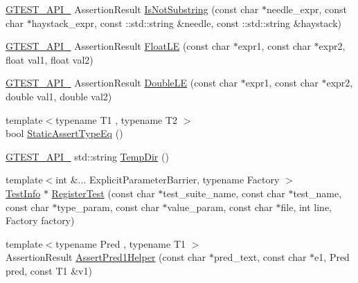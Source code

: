 \begin{DoxyCompactItemize}
\item 
\mbox{\hyperlink{_obj__test_2lib_2googletest-release-1_88_81_2googletest_2include_2gtest_2internal_2gtest-port_8h_aa73be6f0ba4a7456180a94904ce17790}{G\+T\+E\+S\+T\+\_\+\+A\+P\+I\+\_\+}} Assertion\+Result \mbox{\hyperlink{namespacetesting_abe7b3fa1c9528745f934d4a14155ea87}{Is\+Not\+Substring}} (const char $\ast$needle\+\_\+expr, const char $\ast$haystack\+\_\+expr, const \+::std\+::string \&needle, const \+::std\+::string \&haystack)
\item 
\mbox{\hyperlink{_obj__test_2lib_2googletest-release-1_88_81_2googletest_2include_2gtest_2internal_2gtest-port_8h_aa73be6f0ba4a7456180a94904ce17790}{G\+T\+E\+S\+T\+\_\+\+A\+P\+I\+\_\+}} Assertion\+Result \mbox{\hyperlink{namespacetesting_a2c9a2a391c72a7b02ea3024586e33af0}{Float\+LE}} (const char $\ast$expr1, const char $\ast$expr2, float val1, float val2)
\item 
\mbox{\hyperlink{_obj__test_2lib_2googletest-release-1_88_81_2googletest_2include_2gtest_2internal_2gtest-port_8h_aa73be6f0ba4a7456180a94904ce17790}{G\+T\+E\+S\+T\+\_\+\+A\+P\+I\+\_\+}} Assertion\+Result \mbox{\hyperlink{namespacetesting_ae10e2bb304b74abd1b06a2d912a8b43b}{Double\+LE}} (const char $\ast$expr1, const char $\ast$expr2, double val1, double val2)
\item 
{\footnotesize template$<$typename T1 , typename T2 $>$ }\\bool \mbox{\hyperlink{namespacetesting_a661e70fc6afeb5c085eed3716aa45059}{Static\+Assert\+Type\+Eq}} ()
\item 
\mbox{\hyperlink{_obj__test_2lib_2googletest-release-1_88_81_2googletest_2include_2gtest_2internal_2gtest-port_8h_aa73be6f0ba4a7456180a94904ce17790}{G\+T\+E\+S\+T\+\_\+\+A\+P\+I\+\_\+}} std\+::string \mbox{\hyperlink{namespacetesting_aae1bbe7c3cc99bf56263d51d3982a52e}{Temp\+Dir}} ()
\item 
{\footnotesize template$<$int \&... Explicit\+Parameter\+Barrier, typename Factory $>$ }\\\mbox{\hyperlink{classtesting_1_1_test_info}{Test\+Info}} $\ast$ \mbox{\hyperlink{namespacetesting_a8b90d759c019a155800afdd4b8d623c3}{Register\+Test}} (const char $\ast$test\+\_\+suite\+\_\+name, const char $\ast$test\+\_\+name, const char $\ast$type\+\_\+param, const char $\ast$value\+\_\+param, const char $\ast$file, int line, Factory factory)
\item 
{\footnotesize template$<$typename Pred , typename T1 $>$ }\\Assertion\+Result \mbox{\hyperlink{namespacetesting_a7f73180474723be6e92185d6fa9e7c9f}{Assert\+Pred1\+Helper}} (const char $\ast$pred\+\_\+text, const char $\ast$e1, Pred pred, const T1 \&v1)

\end{DoxyCompactItemize}
